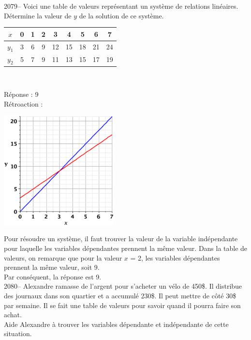 \documentclass[letterpaper, 12pt]{article}
\begin{document}
2079-- Voici une table de valeurs repr\'esentant un syst\`eme de relations lin\'eaires. D\'etermine la valeur de $y$ de la solution de ce syst\`eme.
\begin{center}
 \begin{tabular}{|c||c| c | c | c | c | c | c | c |} \hline
{\bf $x$} & 0 & 1 & 2 & 3 & 4 & 5 & 6 & 7 \\ \hline
{\bf $y_{1}$} & 3 & 6 & 9 & 12 & 15 & 18 & 21 & 24 \\ \hline
{\bf $y_{2}$} & 5 & 7 & 9 & 11 & 13 & 15 & 17 & 19 \\ \hline
\end{tabular} \\[2mm]
\end{center}

R\'eponse : 9\\

R\'etroaction :\\
\begin{center}
 \includegraphics[width=6cm,bb=20 118 575 673]{Q2079.eps}
\end{center}
Pour r\'esoudre un syst\`eme, il faut trouver la valeur de la variable ind\'ependante pour laquelle les variables d\'ependantes prennent la m\^eme valeur. Dans la table de valeurs, on remarque que pour la valeur $x$ = 2, les variables d\'ependantes prennent la m\^eme valeur, soit 9.\\
Par cons\'equent, la r\'eponse est 9.\\


2080-- Alexandre ramasse de l'argent pour s'acheter un v\'elo de 450\$. Il distribue des journaux dans son quartier et a accumul\'e 230\$. Il peut mettre de c\^ot\'e 30\$ par semaine. Il se fait une table de valeurs pour savoir quand il pourra faire son achat. \\
Aide Alexandre \`a trouver les variables d\'ependante et ind\'ependante de cette situation.\\
\end{document}
